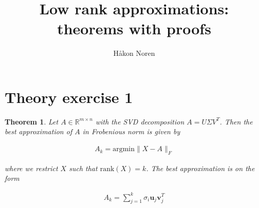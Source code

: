 \documentclass[11pt,a4paper,english]{elsarticle}%
\newtheorem{theorem}{Theorem}
\begin{document}
\begin{frontmatter}

\title{Low rank approximations: theorems with proofs}
\author[matematikk]{Håkon Noren}
\address[matematikk]{Department of Mathematical Science, Norwegian University of Science and Technology, N-7491 Trondheim, Norway.}
\end{frontmatter}

\section{Theory exercise 1}


\begin{theorem}
  Let $A \in \mathbb{R}^{m \times n}$ with the SVD decomposition $A = U\Sigma V^T$. Then the best approximation of $A$ in Frobenious norm is given by

  \begin{align*}
    A_k = \text{argmin}\|X - A\|_F
  \end{align*}

  where we restrict $X$ such that $\text{rank}(X) = k$. The best approximation is on the form

  \begin{align*}
    A_k = \sum_{j=1}^k \sigma_i\bm u_j \bm v_j^T
  \end{align*}
\end{theorem}
\end{document}
